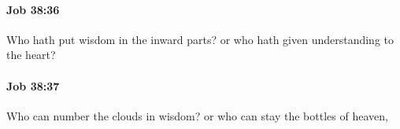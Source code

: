 		\paragraph{Job 38:36} %
			\label{JOB-38-36}

			Who hath put wisdom in the inward parts? or who hath given understanding to the heart?


		\paragraph{Job 38:37} %
			\label{JOB-38-37}

			Who can number the clouds in wisdom? or who can stay the bottles of heaven,


